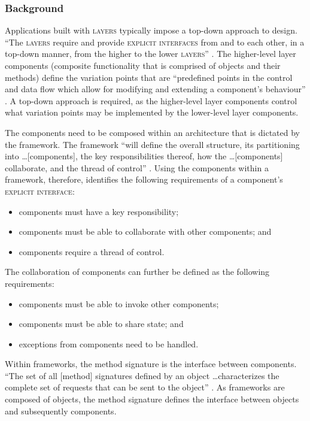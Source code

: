 \documentclass[prodmode]{style/acmlarge}
\begin{document}
\subsubsection*{Background}

Applications built with \textsc{layers} typically impose a top-down approach to
design.  ``The \textsc{layers} require and provide \textsc{explicit interfaces}
from and to each other, in a top-down manner, from the higher to the lower
\textsc{layers}'' \cite[p. 11]{ioc}.  The higher-level layer components
(composite functionality that is comprised of objects and their methods) define
the variation points that are ``predefined points in the control and data flow
which allow for modifying and extending a component's behaviour'' \cite[p.
5]{ioc}.  A top-down approach is required, as the higher-level layer components
control what variation points may be implemented by the lower-level layer
components.

The components need to be composed within an architecture that is dictated by
the framework.  The framework ``will define the overall structure, its
partitioning into \ldots [components], the key responsibilities thereof, how the
\ldots [components] collaborate, and the thread of control'' \cite[p. 26]{gof}.
Using the components within a framework, therefore, identifies the following
requirements of a component's \textsc{explicit interface}:
\begin{itemize}
  \item components must have a key responsibility;
  \item components must be able to collaborate with other components; and
  \item components require a thread of control.
\end{itemize}

The collaboration of components can further be defined as the following
requirements:
\begin{itemize}
  \item components must be able to invoke other components;
  \item components must be able to share state; and
  \item exceptions from components need to be handled.
\end{itemize}

Within frameworks, the method signature is the interface between components.
``The set of all [method] signatures defined by an object \ldots characterizes
the complete set of requests that can be sent to the object'' \cite[p. 13]{gof}.
As frameworks are composed of objects, the method signature defines the
interface between objects and subsequently components.
\end{document}
